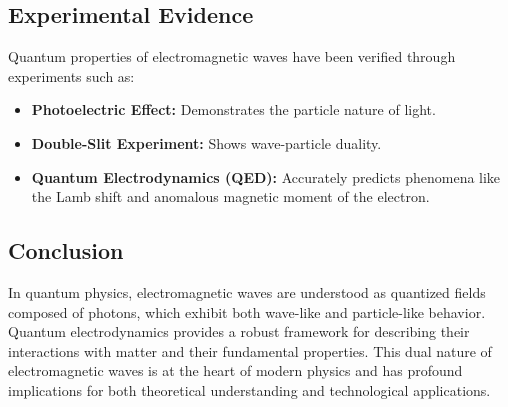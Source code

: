 \subsection{Experimental Evidence}
Quantum properties of electromagnetic waves have been verified through experiments such as:
\begin{itemize}
    \item \textbf{Photoelectric Effect:} Demonstrates the particle nature of light.
    \item \textbf{Double-Slit Experiment:} Shows wave-particle duality.
    \item \textbf{Quantum Electrodynamics (QED):} Accurately predicts phenomena like the Lamb shift and anomalous magnetic moment of the electron.
\end{itemize}

\subsection{Conclusion}
In quantum physics, electromagnetic waves are understood as quantized fields composed of photons, which exhibit both wave-like and particle-like behavior. Quantum electrodynamics provides a robust framework for describing their interactions with matter and their fundamental properties. This dual nature of electromagnetic waves is at the heart of modern physics and has profound implications for both theoretical understanding and technological applications.



